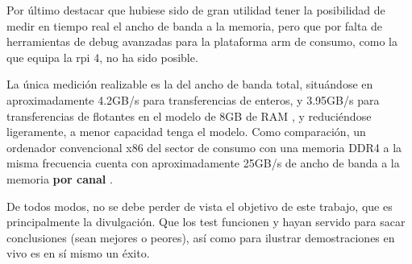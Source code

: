 Por último destacar que hubiese sido de gran utilidad tener la posibilidad de medir en tiempo real el ancho de banda a la memoria, pero que por falta de herramientas de debug avanzadas para la plataforma \acrshort{arm} de consumo, como la que equipa la \acrlong{rpi} 4, no ha sido posible.

La única medición realizable es la del ancho de banda total, situándose en aproximadamente 4.2GB/s para transferencias de enteros, y 3.95GB/s para transferencias de flotantes en el modelo de 8GB de RAM \cite{tomshardware_rpi4b_ram_bandwidth}, y reduciéndose ligeramente, a menor capacidad tenga el modelo. Como comparación, un ordenador convencional x86 del sector de consumo con una memoria DDR4 a la misma frecuencia cuenta con aproximadamente 25GB/s de ancho de banda a la memoria \textbf{por canal} \cite{intel_ram_bandwidth}.

De todos modos, no se debe perder de vista el objetivo de este trabajo, que es principalmente la divulgación. Que los test funcionen y hayan servido para sacar conclusiones (sean mejores o peores), así como para ilustrar demostraciones en vivo es en sí mismo un éxito.